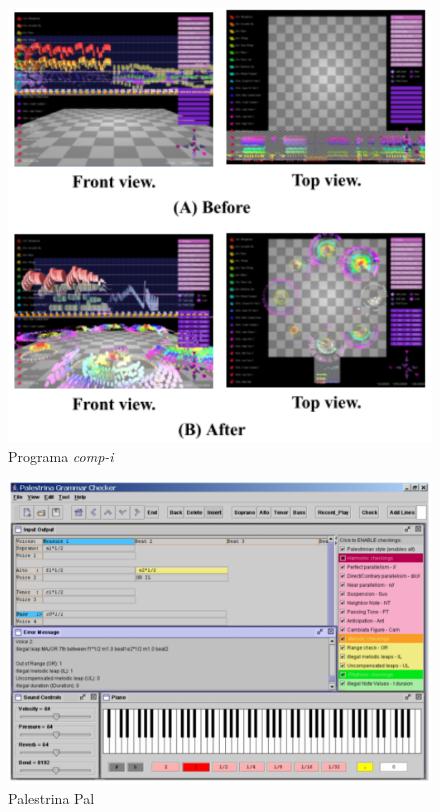\documentclass{sciposter}
\begin{document}
\begin{multicols}{2}
\begin{figure}
  \centering
  \includegraphics{./figs/comp-i.pdf}
  \caption{Programa \textit{comp-i} \cite{Miyazaki2004}}
  \label{fig:label-figura}
\end{figure}

\begin{figure}
  \centering
  \includegraphics{./figs/palestrina-pal.pdf}
  \caption{Palestrina Pal \cite{Gramit2005}}
  \label{fig:label-figura}
\end{figure}

\end{multicols}
\end{document}
